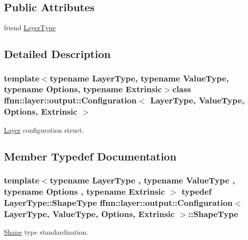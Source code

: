 \subsection*{Public Attributes}
\begin{DoxyCompactItemize}
\item 
friend \hyperlink{classffnn_1_1layer_1_1output_1_1_configuration_a91d957d5fc4cd2f9dcf348096fb013eb}{Layer\-Type}
\end{DoxyCompactItemize}


\subsection{Detailed Description}
\subsubsection*{template$<$typename Layer\-Type, typename Value\-Type, typename Options, typename Extrinsic$>$class ffnn\-::layer\-::output\-::\-Configuration$<$ Layer\-Type, Value\-Type, Options, Extrinsic $>$}

\hyperlink{classffnn_1_1layer_1_1_layer}{Layer} configuration struct. 

\subsection{Member Typedef Documentation}
\hypertarget{classffnn_1_1layer_1_1output_1_1_configuration_a94205bb6347c6cf89c33b2e4f8b467ea}{
\subsubsection[{Shape\-Type}]{\setlength{\rightskip}{0pt plus 5cm}template$<$typename Layer\-Type , typename Value\-Type , typename Options , typename Extrinsic $>$ typedef Layer\-Type\-::\-Shape\-Type {\bf ffnn\-::layer\-::output\-::\-Configuration}$<$ {\bf Layer\-Type}, Value\-Type, Options, Extrinsic $>$\-::{\bf Shape\-Type}}}\label{classffnn_1_1layer_1_1output_1_1_configuration_a94205bb6347c6cf89c33b2e4f8b467ea}


\hyperlink{structffnn_1_1layer_1_1_shape}{Shape} type standardization. 



